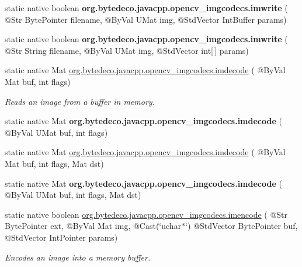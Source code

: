 \begin{DoxyCompactItemize}
\item 
\mbox{\label{group__imgcodecs_gaf7f1995667699feb4b4826bc29fc5a4a}} 
static native boolean {\bfseries org.\+bytedeco.\+javacpp.\+opencv\+\_\+imgcodecs.\+imwrite} ( @Str Byte\+Pointer filename, @By\+Val U\+Mat img, @Std\+Vector Int\+Buffer params)
\item 
\mbox{\label{group__imgcodecs_ga2e6db5b94a2f3d7de9e3258a1c329fc3}} 
static native boolean {\bfseries org.\+bytedeco.\+javacpp.\+opencv\+\_\+imgcodecs.\+imwrite} ( @Str String filename, @By\+Val U\+Mat img, @Std\+Vector int\mbox{[}$\,$\mbox{]} params)
\item 
static native Mat \hyperlink{group__imgcodecs_gac13b3cea648e84cd2ead3c4849023497}{org.\+bytedeco.\+javacpp.\+opencv\+\_\+imgcodecs.\+imdecode} ( @By\+Val Mat buf, int flags)
\begin{DoxyCompactList}\small\item\em Reads an image from a buffer in memory. \end{DoxyCompactList}\item 
\mbox{\label{group__imgcodecs_gaa63601f6e2b1f7e479c7b2b0416d15ba}} 
static native Mat {\bfseries org.\+bytedeco.\+javacpp.\+opencv\+\_\+imgcodecs.\+imdecode} ( @By\+Val U\+Mat buf, int flags)
\item 
static native Mat \hyperlink{group__imgcodecs_gaf794fdf6c3f9d68b53c283bc7ee3d8ef}{org.\+bytedeco.\+javacpp.\+opencv\+\_\+imgcodecs.\+imdecode} ( @By\+Val Mat buf, int flags, Mat dst)
\item 
\mbox{\label{group__imgcodecs_ga4df7da1a0fc5dd168552a725c075e14c}} 
static native Mat {\bfseries org.\+bytedeco.\+javacpp.\+opencv\+\_\+imgcodecs.\+imdecode} ( @By\+Val U\+Mat buf, int flags, Mat dst)
\item 
static native boolean \hyperlink{group__imgcodecs_ga99b838a1ddfa3318e2ba7d2dd5ef42cc}{org.\+bytedeco.\+javacpp.\+opencv\+\_\+imgcodecs.\+imencode} ( @Str Byte\+Pointer ext, @By\+Val Mat img, @Cast(\char`\"{}uchar$\ast$\char`\"{}) @Std\+Vector Byte\+Pointer buf, @Std\+Vector Int\+Pointer params)
\begin{DoxyCompactList}\small\item\em Encodes an image into a memory buffer. \end{DoxyCompactList}\item 

\end{DoxyCompactItemize}
